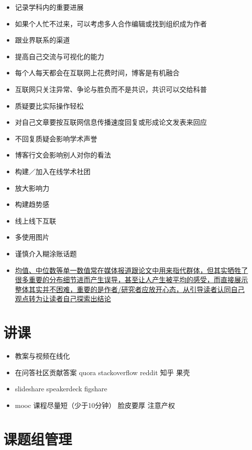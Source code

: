 \documentclass[]{book}
\providecommand{\tightlist}{%
  \setlength{\itemsep}{0pt}\setlength{\parskip}{0pt}}
\begin{document}
\begin{itemize}
\tightlist
\item
  记录学科内的重要进展
\item
  如果个人忙不过来，可以考虑多人合作编辑或找到组织成为作者
\item
  跟业界联系的渠道
\item
  提高自己交流与可视化的能力
\item
  每个人每天都会在互联网上花费时间，博客是有机融合
\item
  互联网只关注异常、争论与胜负而不是共识，共识可以交给科普
\item
  质疑要比实际操作轻松
\item
  对自己文章要按互联网信息传播速度回复或形成论文发表来回应
\item
  不回复质疑会影响学术声誉
\item
  博客行文会影响别人对你的看法
\item
  构建／加入在线学术社团
\item
  放大影响力
\item
  构建趋势感
\item
  线上线下互联
\item
  多使用图片
\item
  谨慎介入糊涂账话题
\item
  \href{http://flowingdata.com/2017/07/07/small-summary-stats/}{均值、中位数等单一数值常在媒体报道跟论文中用来指代群体，但其实牺牲了很多重要的分布细节进而产生误导，甚至让人产生被平均的感受，而直接展示整体其实并不困难，重要的是作者/研究者应放开心态，从引导读者认同自己观点转为让读者自己探索出结论}
\end{itemize}

\section{讲课}

\begin{itemize}
\tightlist
\item
  教案与视频在线化
\item
  在问答社区贡献答案 quora stackoverflow reddit 知乎 果壳
\item
  slideshare speakerdeck figshare
\item
  mooc 课程尽量短（少于10分钟） 脸皮要厚 注意产权
\end{itemize}

\section{课题组管理}
\end{document}
